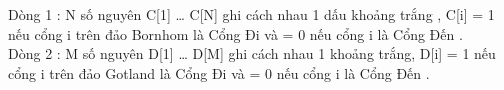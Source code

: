 Dòng 1 : N số nguyên C[1] … C[N] ghi cách nhau 1 dấu khoảng trắng , C[i] = 1 nếu cổng i trên đảo Bornhom là Cổng Đi và = 0 nếu cổng i là Cổng Đến .
\\Dòng 2 : M số nguyên D[1] … D[M] ghi cách nhau 1 khoảng trắng, D[i] = 1 nếu cổng i trên đảo Gotland là Cổng Đi và = 0 nếu cổng i là Cổng Đến .